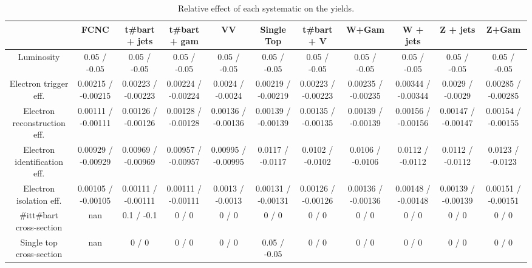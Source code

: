 \begin{table}[htbp]
\begin{center}
\footnotesize
\begin{tabular}{|c|c|c|c|c|c|c|c|c|c|c|}
\hline 
      & FCNC      & t#bar{t} + jets      & t#bar{t} +  gam      & VV      & Single Top      & t#bar{t} + V      & W+Gam      & W + jets      & Z + jets      & Z+Gam \\ 
\hline 
  Luminosity & 0.05 / -0.05 & 0.05 / -0.05 & 0.05 / -0.05 & 0.05 / -0.05 & 0.05 / -0.05 & 0.05 / -0.05 & 0.05 / -0.05 & 0.05 / -0.05 & 0.05 / -0.05 & 0.05 / -0.05 \\ 
  Electron trigger eff. & 0.00215 / -0.00215 & 0.00223 / -0.00223 & 0.00224 / -0.00224 & 0.0024 / -0.0024 & 0.00219 / -0.00219 & 0.00223 / -0.00223 & 0.00235 / -0.00235 & 0.00344 / -0.00344 & 0.0029 / -0.0029 & 0.00285 / -0.00285 \\ 
  Electron reconstruction eff. & 0.00111 / -0.00111 & 0.00126 / -0.00126 & 0.00128 / -0.00128 & 0.00136 / -0.00136 & 0.00139 / -0.00139 & 0.00135 / -0.00135 & 0.00139 / -0.00139 & 0.00156 / -0.00156 & 0.00147 / -0.00147 & 0.00154 / -0.00155 \\ 
  Electron identification eff. & 0.00929 / -0.00929 & 0.00969 / -0.00969 & 0.00957 / -0.00957 & 0.00995 / -0.00995 & 0.0117 / -0.0117 & 0.0102 / -0.0102 & 0.0106 / -0.0106 & 0.0112 / -0.0112 & 0.0112 / -0.0112 & 0.0123 / -0.0123 \\ 
  Electron isolation eff. & 0.00105 / -0.00105 & 0.00111 / -0.00111 & 0.00111 / -0.00111 & 0.0013 / -0.0013 & 0.00131 / -0.00131 & 0.00126 / -0.00126 & 0.00136 / -0.00136 & 0.00148 / -0.00148 & 0.00139 / -0.00139 & 0.00151 / -0.00151 \\ 
  #it{t#bar{t}} cross-section &    nan    & 0.1 / -0.1 & 0 / 0 & 0 / 0 & 0 / 0 & 0 / 0 & 0 / 0 & 0 / 0 & 0 / 0 & 0 / 0 \\ 
  Single top cross-section &    nan    & 0 / 0 & 0 / 0 & 0 / 0 & 0.05 / -0.05 & 0 / 0 & 0 / 0 & 0 / 0 & 0 / 0 & 0 / 0 \\ 
\hline 
\end{tabular} 
\caption{Relative effect of each systematic on the yields.} 
\end{center} 
\end{table} 
